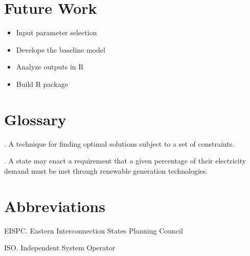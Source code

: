 \documentclass[oneside,12pt]{report}
\begin{document}
\chapter{Future Work}
\begin{itemize}
	\item Input parameter selection
	\item Develope the baseline model
	\item Analyze outputs in R
	\item Build R package
\end{itemize}


\appendix
{}


\chapter{Glossary}\label{Glossary}

\vspace{12pt} 

\vspace{8pt}
. A technique for finding optimal solutions subject to a set of constraints. 

\vspace{8pt}
. A state may enact a requirement that a given percentage of their electricity demand must be met through renewable generation technologies. 
\chapter{Abbreviations}\label{Abbreviations}


\noindent EISPC. Eastern Interconnection States Planning Council

\vspace{5pt}

\noindent ISO. Independent System Operator





\renewcommand\bibname{Selected Bibliography Including Cited Works}
\nocite{*}  %

\end{document}
